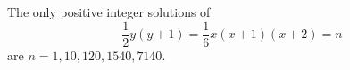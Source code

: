 \begin{proposition}\label{eq:062}
    The only positive integer solutions of
\[
    \frac{1}{2}y(y+1)=\frac{1}{6}x(x+1)(x+2)=n
\]
    are $n=1,10,120,1540,7140$.
\end{proposition}
